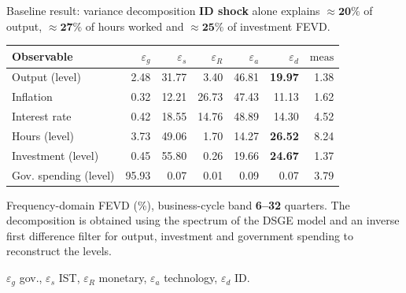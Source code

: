 \documentclass[9pt]{beamer}
\begin{document}
\begin{frame}{Baseline result: variance decomposition}
	\textcolor{invest}{\textbf{ID shock}} alone explains $\approx\!\mathbf{20\%}$ of output, $\approx\!\mathbf{27\%}$ of hours worked and $\approx\!\mathbf{25\%}$ of investment FEVD.

	\vspace{1em}

	\centering
	\small
	\setlength{\tabcolsep}{1.0em}
	\begin{tabular}{l r r r r r r}
	\hline
	Observable & $\varepsilon_g$ & \textcolor{accent}{$\varepsilon_s$} & $\varepsilon_R$ & $\varepsilon_a$ & \textcolor{invest}{$\varepsilon_d$} & $\mathrm{meas}$ \\ 
	\hline
	Output (level) & 2.48 & 31.77 & 3.40 & 46.81 & \textbf{19.97} & 1.38 \\ 
	Inflation & 0.32 & 12.21 & 26.73 & 47.43 & 11.13 & 1.62 \\ 
	Interest rate & 0.42 & 18.55 & 14.76 & 48.89 & 14.30 & 4.52 \\ 
	Hours (level) & 3.73 & 49.06 & 1.70 & 14.27 & \textbf{26.52} & 8.24 \\ 
	Investment (level) & 0.45 & 55.80 & 0.26 & 19.66 & \textbf{24.67} & 1.37 \\ 
	Gov. spending (level) & 95.93 & 0.07 & 0.01 & 0.09 & 0.07 & 3.79 \\ 
	\hline
	\end{tabular}

	\vspace{0.5em}

	{\footnotesize
	Frequency-domain FEVD (\%), business-cycle band \textbf{6--32} quarters. The decomposition is obtained using the spectrum of the DSGE model and an inverse first difference filter for output, investment and government spending to reconstruct the levels.}

	\vspace{1em}

	 $\varepsilon_g$ gov., \textcolor{accent}{$\varepsilon_s$ IST}, $\varepsilon_R$ monetary, $\varepsilon_a$ technology, \textcolor{invest}{$\varepsilon_d$ ID}.
\end{frame}
\end{document}
